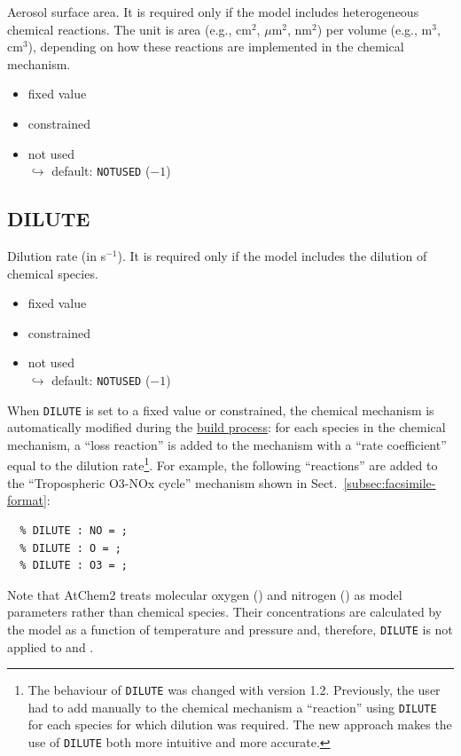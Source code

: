 Aerosol surface area. It is required only if the model includes heterogeneous chemical
reactions. The unit is area (e.g., cm$^2$, $\mu$m$^2$, nm$^2$) per volume (e.g., m$^3$,
cm$^3$), depending on how these reactions are implemented in the chemical mechanism.

\begin{itemize}
\item fixed value
\item constrained
\item not used\\
  $\hookrightarrow$ default: \texttt{NOTUSED} ($-1$)
\end{itemize}

\subsection{DILUTE} \label{subsec:dilute}

Dilution rate (in s$^{-1}$). It is required only if the model includes the dilution of chemical
species.

\begin{itemize}
\item fixed value
\item constrained
\item not used\\
  $\hookrightarrow$ default: \texttt{NOTUSED} ($-1$)
\end{itemize}

When \texttt{DILUTE} is set to a fixed value or constrained, the chemical mechanism is
automatically modified during the \hyperref[subsec:build-process]{build process}: for each
species in the chemical mechanism, a ``loss reaction'' is added to the mechanism with a ``rate
coefficient'' equal to the dilution rate\footnote{The behaviour of \texttt{DILUTE} was changed
  with version 1.2. Previously, the user had to add manually to the chemical mechanism a
  ``reaction'' using \texttt{DILUTE} for each species for which dilution was required. The new
  approach makes the use of \texttt{DILUTE} both more intuitive and more accurate.}. For
example, the following ``reactions'' are added to the ``Tropospheric O3-NOx cycle'' mechanism
shown in Sect.~\ref{subsec:facsimile-format}:

\begin{Verbatim}[fontsize=\small]
  % DILUTE : NO2 = ;
  % DILUTE : NO = ;
  % DILUTE : O = ;
  % DILUTE : O3 = ;
\end{Verbatim}

Note that AtChem2 treats molecular oxygen () and nitrogen () as model parameters
rather than chemical species. Their concentrations are calculated by the model as a function of
temperature and pressure and, therefore, \texttt{DILUTE} is not applied to  and .

